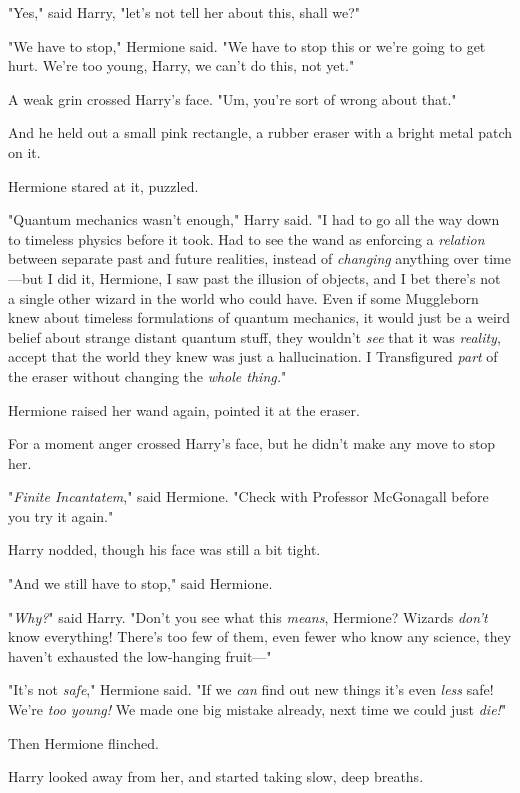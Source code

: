 "Yes," said Harry, "let's not tell her about this, shall we?"

"We have to stop," Hermione said. "We have to stop this or we're going to get 
hurt. We're too young, Harry, we can't do this, not yet."

A weak grin crossed Harry's face. "Um, you're sort of wrong about that."

And he held out a small pink rectangle, a rubber eraser with a bright metal 
patch on it.

Hermione stared at it, puzzled.

"Quantum mechanics wasn't enough," Harry said. "I had to go all the way down to 
timeless physics before it took. Had to see the wand as enforcing a 
\emph{relation} between separate past and future realities, instead of 
\emph{changing} anything over time---but I did it, Hermione, I saw past the 
illusion of objects, and I bet there's not a single other wizard in the world 
who could have. Even if some Muggleborn knew about timeless formulations of 
quantum mechanics, it would just be a weird belief about strange distant 
quantum stuff, they wouldn't \emph{see} that it was \emph{reality}, accept that 
the world they knew was just a hallucination. I Transfigured \emph{part} of the 
eraser without changing the \emph{whole thing.}"

Hermione raised her wand again, pointed it at the eraser.

For a moment anger crossed Harry's face, but he didn't make any move to stop 
her.

"\emph{Finite Incantatem}," said Hermione. "Check with Professor McGonagall 
before you try it again."

Harry nodded, though his face was still a bit tight.

"And we still have to stop," said Hermione.

"\emph{Why?}" said Harry. "Don't you see what this \emph{means}, Hermione? 
Wizards \emph{don't} know everything! There's too few of them, even fewer who 
know any science, they haven't exhausted the low-hanging fruit---"

"It's not \emph{safe}," Hermione said. "If we \emph{can} find out new things 
it's even \emph{less} safe! We're \emph{too young!} We made one big mistake 
already, next time we could just \emph{die!}"

Then Hermione flinched.

Harry looked away from her, and started taking slow, deep breaths.

